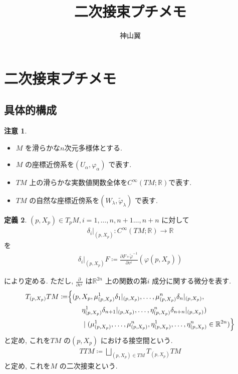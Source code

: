 \documentclass[twocolumn, landscape, a4paper , 8pt, fleqn, titlepage ]{jsarticle}
\title{二次接束プチメモ}
\author{神山翼}
\date{}
\theoremstyle{definition}
\newtheorem{dfn}{定義}[section]
\newtheorem{remark}[dfn]{注意}
\begin{document}
\maketitle
\scriptsize 








\section{二次接束プチメモ}
\subsection{具体的構成}
\begin{remark} \quad \\
\begin{itemize} 
\item $M$ を滑らかな$n$次元多様体とする. 
\item $M$ の座標近傍系を$(U_\alpha, \varphi _\alpha)$ で表す. 
\item $TM$ 上の滑らかな実数値関数全体を$C^\infty(TM; \mathbb R) $で表す. 
\item $TM$ の自然な座標近傍系を$(W_\lambda, \tilde \varphi _\lambda)$ で表す. 
\end{itemize}
\end{remark}


\begin{dfn} 
$(p,X_p) \in T_pM, i = 1, \ldots, n , n+1 \ldots, n+ n$ に対して
\begin{align*} 
\delta_i |_{(p,X_p)} : C^\infty(TM; \mathbb R) \rightarrow \mathbb R 
\end{align*}
を
\begin{align*}
\delta_i |_{(p,X_p)} F \coloneqq \frac{\partial F \circ \tilde \varphi^{-1}  }{ \partial v^i } (\varphi(p, X_p) )  
\end{align*}

により定める. ただし, $\frac{\partial}{\partial v^i}$ は$\mathbb R^{2n}$ 上の関数の第$i$ 成分に関する微分を表す. 
\begin{align*} T_{(p,X_p)} TM \coloneqq & \Bigl\{ (p, X_p, \mu^1_{ (p, X_p)} \delta_1|_{(p,X_p)}, \ldots , \mu^n _{(p,X_p) } \delta_n|_{(p,X_p)}, \\ &\quad \quad   \eta^1 _{(p, X_p) } \delta_{n+1} |_{(p,X_p)}, \ldots , \eta^n _{(p, X_p)} \delta_{n+n} |_{(p,X_p)}  ) \\  &\quad \quad \mid (\mu^1_{(p,X_p)} , \ldots, \mu^n_{(p,X_p)} , \eta^1 _{(p,X_p)}, \ldots, \eta ^n _{(p,X_p)} \in \mathbb R^{2n}    )\Bigr\}  \end{align*}
と定め, これを$TM$ の$(p, X_p)$ における接空間という. \\
\begin{align*} 
TTM \coloneqq \bigsqcup_{(p, X_p) \in TM} T_{(p,X_p)} TM
\end{align*}
と定め, これを$M$ の二次接束という. 
\end{dfn}
\end{document}
